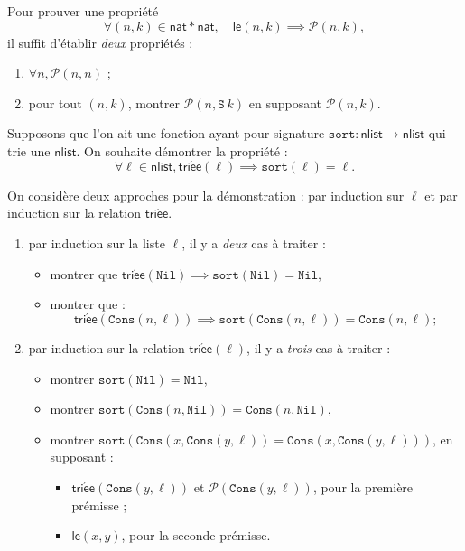 \documentclass[../main]{subfiles}
\begin{document}
  \begin{exm}
    Pour prouver une propriété \[
    \forall (n,k) \in \mathsf{nat} * \mathsf{nat}, \quad \mathsf{le}(n,k) \implies \mathcal{P}(n,k)
    ,\]
    il suffit d'établir \textit{deux} propriétés :
    \begin{enumerate}
      \item $\forall n, \mathcal{P}(n,n)$ ;
      \item pour tout $(n,k)$,  montrer $\mathcal{P}(n,\mathtt{S}\ k)$ en supposant $\mathcal{P}(n,k)$.
    \end{enumerate}
  \end{exm}

  \begin{exm}
    Supposons que l'on ait une fonction ayant pour signature $\mathtt{sort} : \mathsf{nlist} \to  \mathsf{nlist}$ qui trie une $\mathsf{nlist}$.
    On souhaite démontrer la propriété :
    \[
    \forall \ell \in \mathsf{nlist}, \mathsf{tri\acute{e}e}(\ell) \implies \mathtt{sort}(\ell) = \ell
    .\] 

    On considère deux approches pour la démonstration : par induction sur $\ell$ et par induction sur la relation $\mathsf{tri\acute{e}e}$.
    \begin{enumerate}
      \item par induction sur la liste $\ell$, il y a \textit{deux} cas à traiter :
        \begin{itemize}
          \item montrer que $\mathsf{tri\acute{e}e}(\mathtt{Nil}) \implies \mathtt{sort}(\mathtt{Nil}) = \mathtt{Nil}$,
          \item montrer que : \[
          \mathsf{tri\acute{e}e}(\mathtt{Cons}(n,\ell)) \implies \mathtt{sort}(\mathtt{Cons}(n,\ell)) = \mathtt{Cons}(n,\ell)
          ;\] 
        \end{itemize}

      \item par induction sur la relation $\mathsf{tri\acute{e}e}(\ell)$, il y a \textit{trois} cas à traiter :
        \begin{itemize}
          \item montrer $\mathtt{sort}(\mathtt{Nil}) = \mathtt{Nil}$,
          \item montrer $\mathtt{sort}(\mathtt{Cons}(n,\mathtt{Nil})) = \mathtt{Cons}(n,\mathtt{Nil})$,
          \item montrer $\mathtt{sort}(\mathtt{Cons}(x,\mathtt{Cons}(y, \ell)) = \mathtt{Cons}(x,\mathtt{Cons}(y,\ell)))$,
            en supposant :
            \begin{itemize}
              \item $\mathsf{tri\acute{e}e}(\mathtt{Cons}(y,\ell))$ et $\mathcal{P}(\mathtt{Cons}(y,\ell))$, pour la première prémisse ;
              \item $\mathsf{le}(x,y)$, pour la seconde prémisse.
            \end{itemize}
        \end{itemize}
    \end{enumerate}
  \end{exm}
\end{document}
